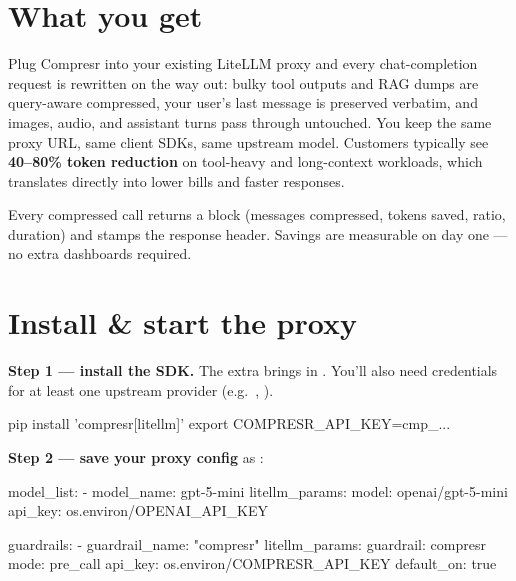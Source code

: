 \documentclass[10pt]{article}
\begin{document}

\section{What you get}

Plug Compresr into your existing LiteLLM proxy and every chat-completion
request is rewritten on the way out: bulky tool outputs and RAG dumps are
query-aware compressed, your user's last message is preserved verbatim, and
images, audio, and assistant turns pass through untouched. You keep the same
proxy URL, same client SDKs, same upstream model. Customers typically see
\textbf{40–80\% token reduction} on tool-heavy and long-context workloads,
which translates directly into lower bills and faster responses.

\begin{cprNoteBox}
Every compressed call returns a  block
(messages compressed, tokens saved, ratio, duration) and stamps the
 response header. Savings are
measurable on day one — no extra dashboards required.
\end{cprNoteBox}

\section{Install \& start the proxy}

\textbf{Step 1 — install the SDK.} The \cprInlineCode{[litellm]} extra
brings in . You'll also need credentials for at
least one upstream provider (e.g.\ ,
).

\begin{shcode}
pip install 'compresr[litellm]'
export COMPRESR_API_KEY=cmp_...
\end{shcode}

\textbf{Step 2 — save your proxy config} as
:

\begin{yamlcode}
model_list:
  - model_name: gpt-5-mini
    litellm_params:
      model: openai/gpt-5-mini
      api_key: os.environ/OPENAI_API_KEY

guardrails:
  - guardrail_name: "compresr"
    litellm_params:
      guardrail: compresr
      mode: pre_call
      api_key: os.environ/COMPRESR_API_KEY
      default_on: true
\end{yamlcode}
\end{document}
